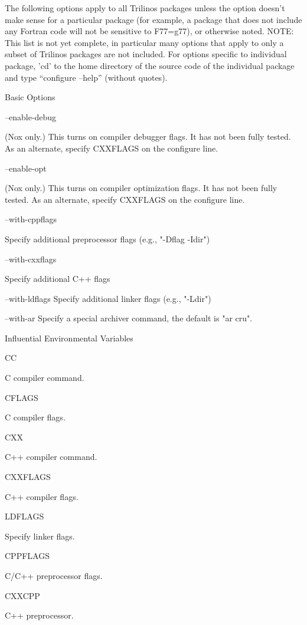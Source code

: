 \documentclass[12pt,relax]{TrilinosDevGuide}
\begin{document}
The following options apply to all Trilinos packages unless 
the option doesn't make sense for a particular package (for example, a 
package that does not include any Fortran code will not be sensitive to 
F77=g77), or otherwise noted.  NOTE: This list is not yet complete, in 
particular many options that apply to only a subset of Trilinos packages 
are not included.  For options specific to individual package, 'cd' to the 
home directory of the source code of the individual package and type 
``configure --help'' (without quotes).

\triangleright Basic Options

\bullet --enable-debug 

(Nox only.)  This turns on compiler debugger flags. It has 
not been fully tested. As an alternate, specify CXXFLAGS on the 
                 configure line.

\bullet --enable-opt

(Nox only.)  This turns on compiler optimization flags. It 
has not been fully tested. As an alternate, specify CXXFLAGS on the 
                 configure line. 

\bullet --with-cppflags 

Specify additional preprocessor flags (e.g., "-Dflag -Idir") 

\bullet --with-cxxflags 

Specify additional C++ flags 

\bullet --with-ldflags 
Specify additional linker flags (e.g., "-Ldir") 

\bullet --with-ar 
Specify a special archiver command, the default is "ar cru". 

\triangleright Influential Environmental Variables

\bullet CC 

C compiler command.

\bullet CFLAGS 

C compiler flags.

\bullet CXX 

C++ compiler command.

\bullet CXXFLAGS 

C++ compiler flags.

\bullet LDFLAGS 

Specify linker flags.

\bullet CPPFLAGS 

C/C++ preprocessor flags.

\bullet CXXCPP 

C++ preprocessor.
\end{document}
